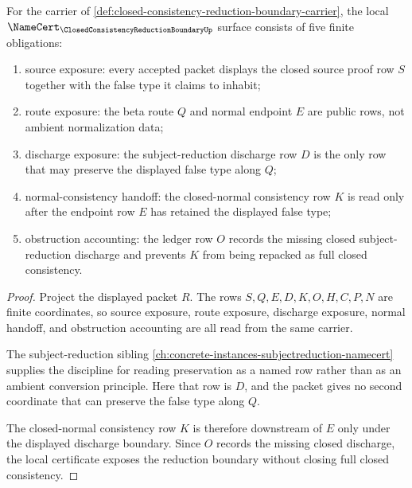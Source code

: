 \begin{theorem}
\label{thm:closed-consistency-reduction-boundary-namecert-obligations}
For the carrier of
\autoref{def:closed-consistency-reduction-boundary-carrier}, the local
$\NameCert_{\ClosedConsistencyReductionBoundaryUp}$ surface consists of five
finite obligations:
\begin{enumerate}
\item source exposure: every accepted packet displays the closed source proof
row $S$ together with the false type it claims to inhabit;
\item route exposure: the beta route $Q$ and normal endpoint $E$ are public
rows, not ambient normalization data;
\item discharge exposure: the subject-reduction discharge row $D$ is the only
row that may preserve the displayed false type along $Q$;
\item normal-consistency handoff: the closed-normal consistency row $K$ is read
only after the endpoint row $E$ has retained the displayed false type;
\item obstruction accounting: the ledger row $O$ records the missing closed
subject-reduction discharge and prevents $K$ from being repacked as full closed
consistency.
\end{enumerate}
\end{theorem}
\begin{proof}
Project the displayed packet $R$. The rows $S,Q,E,D,K,O,H,C,P,N$ are finite
coordinates, so source exposure, route exposure, discharge exposure, normal
handoff, and obstruction accounting are all read from the same carrier.

The subject-reduction sibling
\autoref{ch:concrete-instances-subjectreduction-namecert} supplies the
discipline for reading preservation as a named row rather than as an ambient
conversion principle. Here that row is $D$, and the packet gives no second
coordinate that can preserve the false type along $Q$.

The closed-normal consistency row $K$ is therefore downstream of $E$ only under
the displayed discharge boundary. Since $O$ records the missing closed
discharge, the local certificate exposes the reduction boundary without closing
full closed consistency.
\end{proof}

